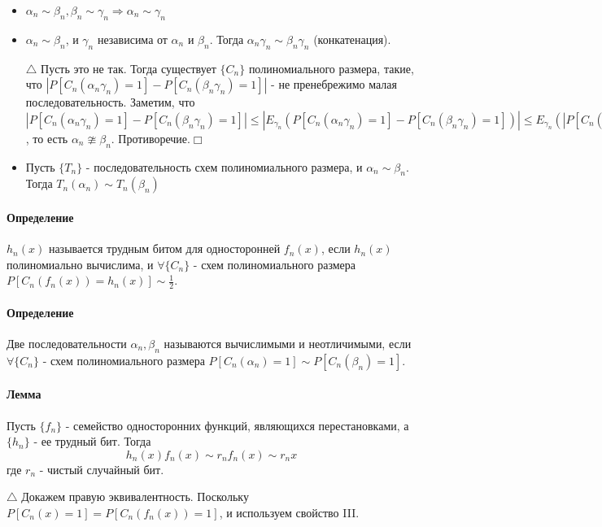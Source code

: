 \documentclass[12pt, a4paper]{article}
\begin{document}
\begin{itemize}
 \item[1)] $\alpha_n \sim \beta_n, \beta_n \sim \gamma_n \Rightarrow \alpha_n \sim \gamma_n$
 \item[2)] $\alpha_n \sim \beta_n$, и $\gamma_n$ независима от $\alpha_n$ и $\beta_n$. Тогда $\alpha_n\gamma_n \sim \beta_n\gamma_n$ (конкатенация).
 
 $\triangle$ Пусть это не так. Тогда существует $\{C_n\}$ полиномиального размера, такие, что
 $|P[C_n(\alpha_n\gamma_n)=1] - P[C_n(\beta_n\gamma_n)=1]|$ - не пренебрежимо малая последовательность. Заметим, что $|P[C_n(\alpha_n\gamma_n)=1] - P[C_n(\beta_n\gamma_n)=1]| \leq |E_{\gamma_n}(P[C_n(\alpha_n\gamma_n)=1] - P[C_n(\beta_n\gamma_n)=1])| \leq E_{\gamma_n}(|P[C_n(\alpha_n\gamma_n)=1] - P[C_n(\beta_n\gamma_n)=1]|) \leq |P[C_n(\alpha_n\gamma_{max})=1] - P[C_n(\beta_n\gamma_{max})=1])|$, то есть $\alpha_n \ncong \beta_n$. Противоречие.$\Box$
 \item[3)] Пусть $\{T_n\}$ - последовательность схем полиномиального размера, и $\alpha_n \sim \beta_n$. Тогда $T_n(\alpha_n) \sim T_n(\beta_n)$
\end{itemize}

\paragraph{Определение} $h_n(x)$ называется трудным битом для односторонней $f_n(x)$, если $h_n(x)$ полиномиально вычислима, и $\forall \{C_n\}$ - схем полиномиального размера $P[C_n(f_n(x))=h_n(x)] \sim \frac{1}{2}$.

\paragraph{Определение} Две последовательности $\alpha_n, \beta_n$ называются вычислимыми и неотличимыми, если $\forall \{C_n\}$ - схем полиномиального размера $P[C_n(\alpha_n)=1] \sim P[C_n(\beta_n)=1]$.

\paragraph{Лемма} Пусть $\{f_n\}$ - семейство односторонних функций, являющихся перестановками, а $\{h_n\}$ - ее трудный бит. Тогда
\[
 h_n(x)f_n(x) \sim r_n f_n(x) \sim r_n x
\]
где $r_n$ - чистый случайный бит.

$\triangle$ Докажем правую эквивалентность. Поскольку $P[C_n(x)=1]=P[C_n(f_n(x))=1]$, и используем свойство III.
\end{document}
